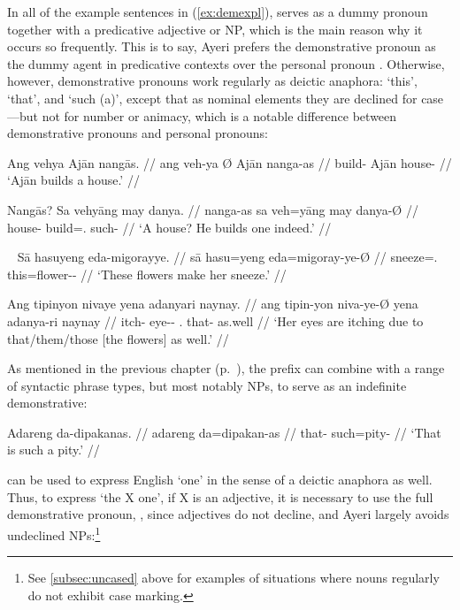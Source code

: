 \xe


In all of the example sentences in (\ref{ex:demexpl}),
 serves as a dummy pronoun together with a
predicative adjective or NP, which is the main reason why it occurs so
frequently. This is to say, Ayeri prefers the demonstrative pronoun
 as the dummy agent in predicative contexts over the
personal pronoun . Otherwise, however, demonstrative
pronouns work regularly as deictic anaphora: `this', `that', and `such (a)',
except that as nominal elements they are declined for case---but not for number
or animacy, which is a notable difference between demonstrative pronouns and
personal pronouns:

\pex
\a\begingl
	\gla Ang vehya {} Ajān nangās. //
	\glb ang veh-ya Ø Ajān nanga-as //
	\glc \AgtT{} build-\TsgM{} \Top{} Ajān house-\Parg{} //
	\glft `Ajān builds a house.' //
\endgl

\a\begingl
	\gla Nangās? Sa vehyāng may danya. //
	\glb nanga-as sa veh=yāng may danya-Ø //
	\glc house-\Parg{} \PatT{} build=\TsgM{}.\Aarg{} \Aff{} such-\Top{} //
	\glft `A house? He builds one indeed.' //
\endgl

\xe

\pex~
\a\begingl
	\gla Sā hasuyeng eda-migorayye. //
	\glb sā hasu=yeng eda=migoray-ye-Ø //
	\glc \CauT{} sneeze=\TsgF{}.\Aarg{} this=flower-\Pl{}-\Top{} //
	\glft `These flowers make her sneeze.' //
\endgl

\a\begingl
	\gla Ang tipinyon nivaye yena adanyari naynay. //
	\glb ang tipin-yon niva-ye-Ø yena adanya-ri naynay //
	\glc \AgtT{} itch-\TplN{} eye-\Pl{}-\Top{} \TsgF{}.\Gen{} that-\Caus{} 
		as.well //
	\glft `Her eyes are itching due to that/them/those [the flowers] as 
		well.' //
\endgl
\xe

As mentioned in the previous chapter (p.~\pageref{nounprefixes}), the prefix 
 can combine with a range of syntactic phrase types, 
but most notably NPs, to serve as an indefinite demonstrative:

\ex\begingl
	\gla Adareng da-dipakanas. //
	\glb adareng da=dipakan-as //
	\glc that-\AargI{} such=pity-\Parg{} //
	\glft `That is such a pity.' //
\endgl\xe

 can be used to express English `one' in the sense of a deictic
anaphora as well. Thus, to express `the X one', if X is an adjective, it is
necessary to use the full demonstrative pronoun, , since
adjectives do not decline, and Ayeri largely avoids undeclined
NPs:\footnote{See \autoref{subsec:uncased} above for examples of situations
where nouns regularly do not exhibit case marking.}

